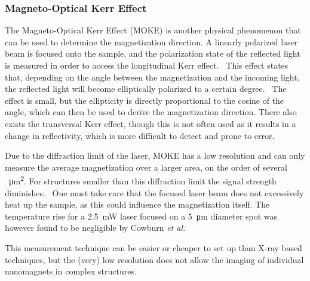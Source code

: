 \documentclass[12pt,a4paper]{article}
\begin{document}
\subsubsection{Magneto-Optical Kerr Effect}
The Magneto-Optical Kerr Effect (MOKE) is another physical phenomenon that can be used to determine the magnetization direction. A linearly polarized laser beam is focused onto the sample, and the polarization state of the reflected light is measured in order to access the longitudinal Kerr effect.~\cite{MQCA_RoomTemp} This effect states that, depending on the angle between the magnetization and the incoming light, the reflected light will become elliptically polarized to a certain degree.~\cite{KerrFaraday_book} The effect is small, but the ellipticity is directly proportional to the cosine of the angle, which can then be used to derive the magnetization direction. There also exists the transversal Kerr effect, though this is not often used as it results in a change in reflectivity, which is more difficult to detect and prone to error. \par
Due to the diffraction limit of the laser, MOKE has a low resolution and can only measure the average magnetization over a larger area, on the order of several \SI{}{\micro\metre\squared}. For structures smaller than this diffraction limit the signal strength diminishes.~\cite{Probing_MagnetoOptics} One must take care that the focused laser beam does not excessively heat up the sample, as this could influence the magnetization itself. The temperature rise for a \SI{2.5}{\milli\watt} laser focused on a \SI{5}{\micro\metre} diameter spot was however found to be negligible by Cowburn \textit{et al.}~\cite{Probing_MagnetoOptics} \par
This measurement technique can be easier or cheaper to set up than X-ray based techniques, but the (very) low resolution does not allow the imaging of individual nanomagnets in complex structures.

\clearpage
\end{document}
